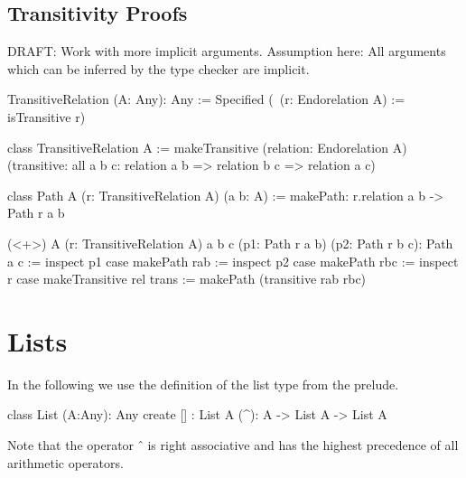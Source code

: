 \vskip 5mm
\subsection{Transitivity Proofs}

DRAFT: Work with more implicit arguments. Assumption here: All arguments which
can be inferred by the type checker are implicit.



\begin{alba}
    TransitiveRelation (A: Any): Any :=
        Specified (\ (r: Endorelation A) := isTransitive r)

    class
        TransitiveRelation A
    :=
        makeTransitive
            (relation: Endorelation A)
            (transitive:
                all a b c:
                    relation a b => relation b c => relation a c)

    class
        Path A (r: TransitiveRelation A) (a b: A)
    :=
        makePath: r.relation a b -> Path r a b


    (<+>)
        A (r: TransitiveRelation A) a b c
        (p1: Path r a b)
        (p2: Path r b c):
        Path a c
    :=
        inspect p1 case
            makePath rab :=
                inspect p2 case
                    makePath rbc :=
                        inspect r case
                            makeTransitive rel trans :=
                                makePath
                                    (transitive rab rbc)

\end{alba}












\newpage
\section{Lists}
\label{sec:certprog-lists}


In the following we use the definition of the list type from the prelude.

\begin{alba}
  class
    List (A:Any): Any
  create
    [] : List A
    (^): A -> List A -> List A
\end{alba}
%
Note that the operator $\mathrel{\hat{\ }}$ is right associative and has the
highest precedence of all arithmetic operators.



